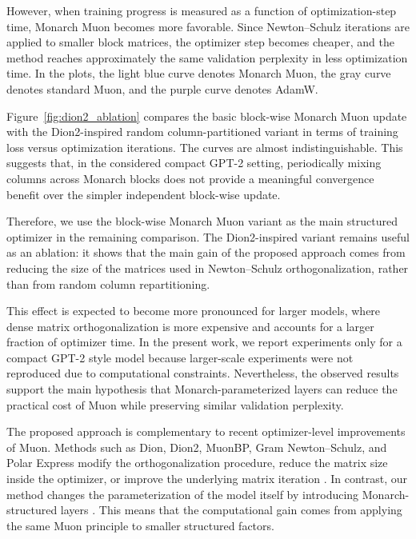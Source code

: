 \documentclass{article}
\begin{document}
However, when training progress is measured as a function of optimization-step time, Monarch Muon becomes more favorable. Since Newton--Schulz iterations are applied to smaller block matrices, the optimizer step becomes cheaper, and the method reaches approximately the same validation perplexity in less optimization time. In the plots, the light blue curve denotes Monarch Muon, the gray curve denotes standard Muon, and the purple curve denotes AdamW.

Figure~\ref{fig:dion2_ablation} compares the basic block-wise Monarch Muon update with the Dion2-inspired random column-partitioned variant in terms of training loss versus optimization iterations. The curves are almost indistinguishable. This suggests that, in the considered compact GPT-2 setting, periodically mixing columns across Monarch blocks does not provide a meaningful convergence benefit over the simpler independent block-wise update.

Therefore, we use the block-wise Monarch Muon variant as the main structured optimizer in the remaining comparison. The Dion2-inspired variant remains useful as an ablation: it shows that the main gain of the proposed approach comes from reducing the size of the matrices used in Newton--Schulz orthogonalization, rather than from random column repartitioning.

This effect is expected to become more pronounced for larger models, where dense matrix orthogonalization is more expensive and accounts for a larger fraction of optimizer time. In the present work, we report experiments only for a compact GPT-2 style model because larger-scale experiments were not reproduced due to computational constraints. Nevertheless, the observed results support the main hypothesis that Monarch-parameterized layers can reduce the practical cost of Muon while preserving similar validation perplexity.

The proposed approach is complementary to recent optimizer-level improvements of Muon. Methods such as Dion, Dion2, MuonBP, Gram Newton--Schulz, and Polar Express modify the orthogonalization procedure, reduce the matrix size inside the optimizer, or improve the underlying matrix iteration \cite{ahn2025diondistributedorthonormalizedupdates,ahn2025dion2simplemethodshrink,khaled2025muonbpfastermuonblockperiodic,GramNewtonSchulz,amsel2026polarexpressoptimalmatrix}. In contrast, our method changes the parameterization of the model itself by introducing Monarch-structured layers \cite{dao2022monarchexpressivestructuredmatrices}. This means that the computational gain comes from applying the same Muon principle to smaller structured factors.
\end{document}
